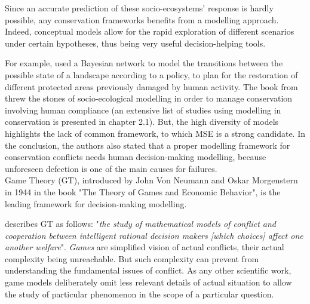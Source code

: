 \documentclass[12pt,a4paper]{article}
\begin{document}
Since an accurate prediction of these socio-ecosystems' response is hardly possible, any conservation frameworks benefits from a modelling approach.
Indeed, conceptual models allow for the rapid exploration of different scenarios under certain hypotheses, thus being very useful decision-helping tools.
%

For example, \cite{rumpff2011state} used a Bayesian network to model the transitions between the possible state of a landscape according to a policy, to plan for the restoration of different protected areas previously damaged by human activity.
The book from \cite{schluter2012new} threw the stones of socio-ecological modelling in order to manage conservation involving human compliance (an extensive list of studies using modelling in conservation is presented in chapter 2.1).
But, the high diversity of models highlights the lack of common framework, to which MSE is a strong candidate.
In the conclusion, the authors also stated that a proper modelling framework for conservation conflicts needs human decision-making modelling, because unforeseen defection is one of the main causes for failures.\\
%

Game Theory (GT), introduced by John Von Neumann and Oskar Morgenstern in 1944 in the book "The Theory of Games and Economic Behavior", is the leading framework for decision-making modelling.

\cite{myerson1997game} describes GT as follows: "\textit{the study of mathematical models of conflict and cooperation between intelligent rational decision makers [which choices] affect one another welfare}".
\textit{Games} are simplified vision of actual conflicts, their actual complexity being unreachable.
But such complexity can prevent from understanding the fundamental issues of conflict. %
As any other scientific work, game models deliberately omit less relevant details of actual situation to allow the study of particular phenomenon in the scope of a particular question.
\end{document}
